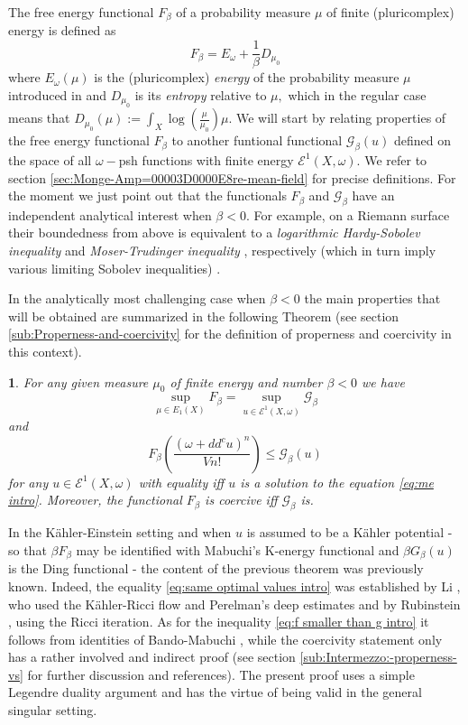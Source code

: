 \documentclass[11pt,oneside,english]{amsart}
\numberwithin{equation}{section}
\numberwithin{figure}{section}
\theoremstyle{plain}
\newtheorem{thm}{\protect\theoremname}[section]
\theoremstyle{plain}
\theoremstyle{plain}
\theoremstyle{plain}
\theoremstyle{remark}
\theoremstyle{definition}
\providecommand{\theoremname}{Theorem}
\begin{document}
The free energy functional $F_{\beta}$ of a probability measure $\mu$
of finite (pluricomplex) energy is defined as 
\begin{equation}
F_{\beta}=E_{\omega}+\frac{1}{\beta}D_{\mu_{0}}\label{eq:def of f intro}
\end{equation}
where $E_{\omega}(\mu)$ is the (pluricomplex)\emph{ energy }of the
probability measure $\mu$ introduced in \cite{bbgz} and $D_{\mu_{0}}$
is its \emph{entropy} relative to $\mu,$ which in the regular case
means that $D_{\mu_{0}}(\mu):=\int_{X}\log(\frac{\mu}{\mu_{0}})\mu.$
We will start by relating properties of the free energy functional
$F_{\beta}$ to another funtional functional $\mathcal{G}_{\beta}(u)$
defined on the space of all $\omega-$psh functions with finite energy
$\mathcal{E}^{1}(X,\omega).$ We refer to section \ref{sec:Monge-Amp=00003D0000E8re-mean-field}
for precise definitions. For the moment we just point out that the
functionals $F_{\beta}$ and $\mathcal{G}_{\beta}$ have an independent
analytical interest when $\beta<0.$ For example, on a Riemann surface
their boundedness from above is equivalent to a \emph{logarithmic
Hardy-Sobolev inequality} and \emph{Moser-Trudinger inequality} ,
respectively (which in turn imply various limiting Sobolev inequalities)\emph{
}\cite{Bec,c-l}.

In the analytically most challenging case when $\beta<0$ the main
properties that will be obtained are summarized in the following Theorem
(see section \ref{sub:Properness-and-coercivity} for the definition
of properness and coercivity in this context). 
\begin{thm}
\label{thm:duality intro}For any given measure $\mu_{0}$ of finite
energy and number $\beta<0$ we have 
\begin{equation}
\sup_{\mu\in E_{1}(X)}F_{\beta}=\sup_{u\in\mathcal{E}^{1}(X,\omega)}\mathcal{G}_{\beta}\label{eq:same optimal values intro}
\end{equation}
 and 
\begin{equation}
F_{\beta}(\frac{(\omega+dd^{c}u)^{n}}{Vn!})\leq\mathcal{G}_{\beta}(u)\label{eq:f smaller than g intro}
\end{equation}
 for any $u\in\mathcal{E}^{1}(X,\omega)$ with equality iff $u$ is
a solution to the  equation \ref{eq:me intro}. Moreover, the functional
$F_{\beta}$ is coercive iff $\mathcal{G}_{\beta}$ is. 
\end{thm}
In the Kähler-Einstein setting and when $u$ is assumed to be a Kähler
potential - so that $\beta F_{\beta}$ may be identified with Mabuchi's
K-energy functional and $\beta G_{\beta}(u)$ is the Ding functional
- the content of the previous theorem was previously known. Indeed,
the equality \ref{eq:same optimal values intro} was established by
Li \cite{li}, who used the Kähler-Ricci flow and Perelman's deep
estimates and by Rubinstein \cite{rub0,rub1}, using the Ricci iteration.
As for the inequality \ref{eq:f smaller than g intro} it follows
from identities of Bando-Mabuchi \cite{b-m}, while the coercivity
statement only has a rather involved and indirect proof (see section
\ref{sub:Intermezzo:-properness-vs} for further discussion and references).
The present proof uses a simple Legendre duality argument and has
the virtue of being valid in the general singular setting.
\end{document}
